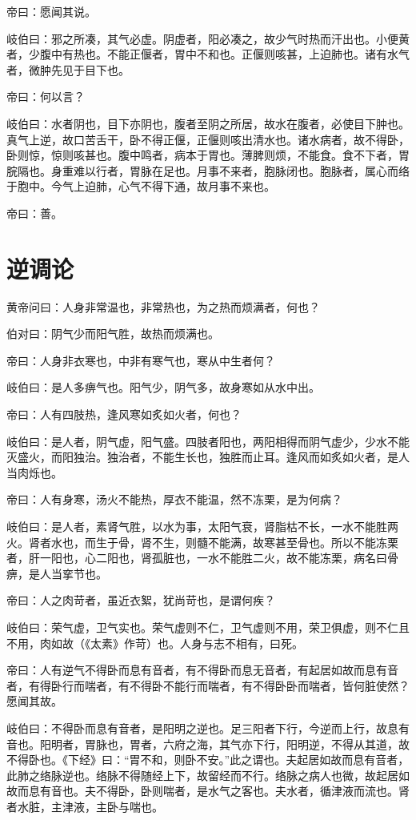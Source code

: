 \documentclass{article}%
\begin{document}
帝曰：愿闻其说。

岐伯曰：邪之所凑，其气必虚。阴虚者，阳必凑之，故少气时热而汗出也。小便黄者，少腹中有热也。不能正偃者，胃中不和也。正偃则咳甚，上迫肺也。诸有水气者，微肿先见于目下也。

帝曰：何以言？

岐伯曰：水者阴也，目下亦阴也，腹者至阴之所居，故水在腹者，必使目下肿也。真气上逆，故口苦舌干，卧不得正偃，正偃则咳出清水也。诸水病者，故不得卧，卧则惊，惊则咳甚也。腹中鸣者，病本于胃也。薄脾则烦，不能食。食不下者，胃脘隔也。身重难以行者，胃脉在足也。月事不来者，胞脉闭也。胞脉者，属心而络于胞中。今气上迫肺，心气不得下通，故月事不来也。

帝曰：善。
\section{逆调论}
黄帝问曰：人身非常温也，非常热也，为之热而烦满者，何也？

伯对曰：阴气少而阳气胜，故热而烦满也。

帝曰：人身非衣寒也，中非有寒气也，寒从中生者何？

岐伯曰：是人多痹气也。阳气少，阴气多，故身寒如从水中出。

帝曰：人有四肢热，逢风寒如炙如火者，何也？

岐伯曰：是人者，阴气虚，阳气盛。四肢者阳也，两阳相得而阴气虚少，少水不能灭盛火，而阳独治。独治者，不能生长也，独胜而止耳。逢风而如炙如火者，是人当肉烁也。

帝曰：人有身寒，汤火不能热，厚衣不能温，然不冻栗，是为何病？

岐伯曰：是人者，素肾气胜，以水为事，太阳气衰，肾脂枯不长，一水不能胜两火。肾者水也，而生于骨，肾不生，则髓不能满，故寒甚至骨也。所以不能冻栗者，肝一阳也，心二阳也，肾孤脏也，一水不能胜二火，故不能冻栗，病名曰骨痹，是人当挛节也。

帝曰：人之肉苛者，虽近衣絮，犹尚苛也，是谓何疾？

岐伯曰：荣气虚，卫气实也。荣气虚则不仁，卫气虚则不用，荣卫俱虚，则不仁且不用，肉如故（《太素》作苛）也。人身与志不相有，曰死。

帝曰：人有逆气不得卧而息有音者，有不得卧而息无音者，有起居如故而息有音者，有得卧行而喘者，有不得卧不能行而喘者，有不得卧卧而喘者，皆何脏使然？愿闻其故。

岐伯曰：不得卧而息有音者，是阳明之逆也。足三阳者下行，今逆而上行，故息有音也。阳明者，胃脉也，胃者，六府之海，其气亦下行，阳明逆，不得从其道，故不得卧也。《下经》曰：“胃不和，则卧不安。”此之谓也。夫起居如故而息有音者，此肺之络脉逆也。络脉不得随经上下，故留经而不行。络脉之病人也微，故起居如故而息有音也。夫不得卧，卧则喘者，是水气之客也。夫水者，循津液而流也。肾者水脏，主津液，主卧与喘也。
\end{document}
